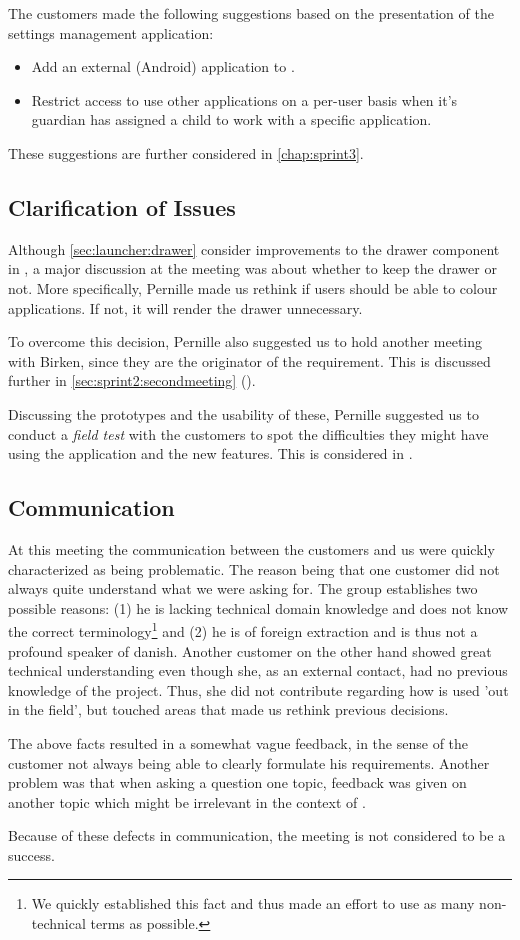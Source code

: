 The customers made the following suggestions based on the presentation of the settings management application:

\begin{itemize}
\item Add an external (Android) application to \launcher.
\item Restrict access to use other applications on a per-user basis when it's guardian has assigned a child to work with a specific application.
\end{itemize}

These suggestions are further considered in \cref{chap:sprint3}.


\subsection{Clarification of Issues}
Although \cref{sec:launcher:drawer} consider improvements to the drawer component in \giraf, a major discussion at the meeting was about whether to keep the drawer or not.
More specifically, Pernille made us rethink if users should be able to colour applications.
If not, it will render the drawer unnecessary.

To overcome this decision, Pernille also suggested us to hold another meeting with Birken, since they are the originator of the requirement.
This is discussed further in \cref{sec:sprint2:secondmeeting} ().

Discussing the prototypes and the usability of these, Pernille suggested us to conduct a \textit{field test} with the customers to spot the difficulties they might have using the application and the new features.
This is considered in .

\subsection{Communication}
At this meeting the communication between the customers and us were quickly characterized as being problematic.
The reason being that one customer did not always quite understand what we were asking for.
The group establishes two possible reasons:
(1) he is lacking technical domain knowledge and does not know the correct terminology\footnote{We quickly established this fact and thus made an effort to use as many non-technical terms as possible.} and (2) he is of foreign extraction and is thus not a profound speaker of danish.
Another customer on the other hand showed great technical understanding even though she, as an external contact, had no previous knowledge of the \giraf project.
Thus, she did not contribute regarding how \giraf is used 'out in the field', but touched areas that made us rethink previous decisions.

The above facts resulted in a somewhat vague feedback, in the sense of the customer not always being able to clearly formulate his requirements.
Another problem was that when asking a question one topic, feedback was given on another topic which might be irrelevant in the context of \launcher.

Because of these defects in communication, the meeting is not considered to be a success.